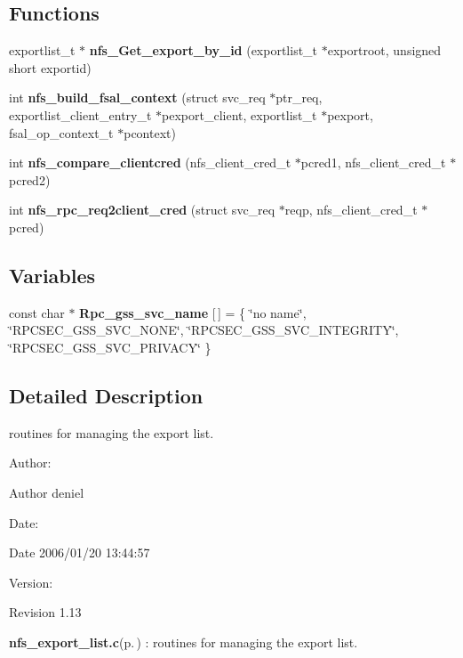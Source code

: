 \subsection*{Functions}
\begin{CompactItemize}
\item 
exportlist\_\-t $\ast$ {\bf nfs\_\-Get\_\-export\_\-by\_\-id} (exportlist\_\-t $\ast$exportroot, unsigned short exportid)
\item 
int {\bf nfs\_\-build\_\-fsal\_\-context} (struct svc\_\-req $\ast$ptr\_\-req, exportlist\_\-client\_\-entry\_\-t $\ast$pexport\_\-client, exportlist\_\-t $\ast$pexport, fsal\_\-op\_\-context\_\-t $\ast$pcontext)
\item 
int {\bf nfs\_\-compare\_\-clientcred} (nfs\_\-client\_\-cred\_\-t $\ast$pcred1, nfs\_\-client\_\-cred\_\-t $\ast$pcred2)
\item 
int {\bf nfs\_\-rpc\_\-req2client\_\-cred} (struct svc\_\-req $\ast$reqp, nfs\_\-client\_\-cred\_\-t $\ast$pcred)
\end{CompactItemize}
\subsection*{Variables}
\begin{CompactItemize}
\item 
const char $\ast$ {\bf Rpc\_\-gss\_\-svc\_\-name} [$\,$] = \{ \char`\"{}no name\char`\"{}, \char`\"{}RPCSEC\_\-GSS\_\-SVC\_\-NONE\char`\"{}, \char`\"{}RPCSEC\_\-GSS\_\-SVC\_\-INTEGRITY\char`\"{}, \char`\"{}RPCSEC\_\-GSS\_\-SVC\_\-PRIVACY\char`\"{} \}
\end{CompactItemize}


\subsection{Detailed Description}
routines for managing the export list. 

\begin{Desc}
\item[Author:]\begin{Desc}
\item[Author]deniel \end{Desc}
\end{Desc}
\begin{Desc}
\item[Date:]\begin{Desc}
\item[Date]2006/01/20 13:44:57 \end{Desc}
\end{Desc}
\begin{Desc}
\item[Version:]\begin{Desc}
\item[Revision]1.13 \end{Desc}
\end{Desc}
{\bf nfs\_\-export\_\-list.c}{\rm (p.\,\pageref{nfs__export__list_8c})} : routines for managing the export list.

